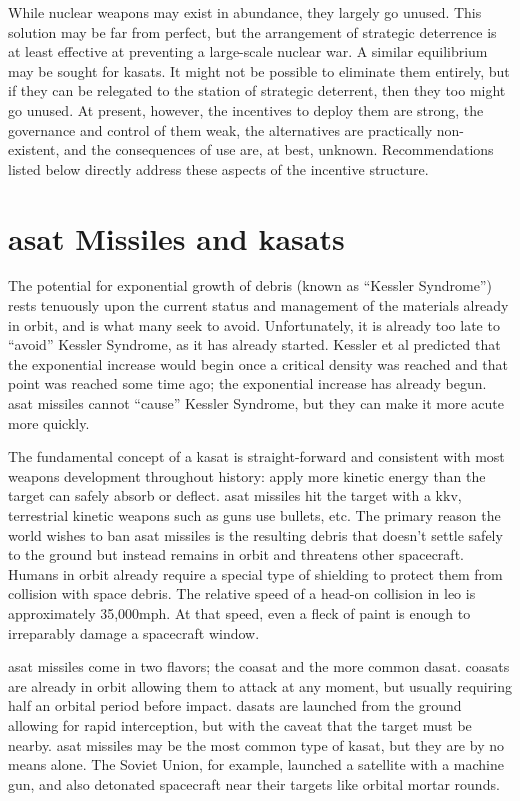 While nuclear weapons may exist in abundance, they largely go unused.
This solution may be far from perfect, but the arrangement of
strategic deterrence is at least effective at preventing a large-scale
nuclear war.  A similar equilibrium may be sought for \acp{kasat}.  It
might not be possible to eliminate them entirely, but if they can be
relegated to the station of strategic deterrent, then they too might
go unused.  At present, however, the incentives to deploy them are
strong, the governance and control of them weak, the alternatives are
practically non-existent, and the consequences of use are, at best,
unknown.  Recommendations listed below directly address these aspects
of the incentive structure.

\section*{\ac{asat} Missiles and \acfp{kasat}}

The potential for exponential growth of debris (known as ``Kessler
Syndrome'') rests tenuously upon the current status and management of
the materials already in orbit, and is what many seek to avoid.
Unfortunately, it is already too late to ``avoid'' Kessler Syndrome,
as it has already started.  Kessler et al predicted that the
exponential increase would begin once a critical density was reached
and that point was reached some time ago; the exponential increase has
already begun.\cite[p14]{kessler-reunion} \ac{asat} missiles cannot
``cause'' Kessler Syndrome, but they can make it more acute more
quickly.\cite[p10]{kessler-reunion}

The fundamental concept of a \ac{kasat} is straight-forward and
consistent with most weapons development throughout history: apply
more kinetic energy than the target can safely absorb or deflect.
\ac{asat} missiles hit the target with a \ac{kkv}, terrestrial kinetic
weapons such as guns use bullets, etc.  The primary reason the world
wishes to ban \ac{asat} missiles is the resulting debris that doesn't
settle safely to the ground but instead remains in orbit and threatens
other spacecraft.  Humans in orbit already require a special type of
shielding to protect them from collision with space
debris.\cite{whipple-me-spacecraft} The relative speed of a head-on
collision in \ac{leo} is approximately 35,000mph.  At that speed, even
a fleck of paint is enough to irreparably damage a spacecraft
window.\cite{paint-is-power}

\ac{asat} missiles come in two flavors; the \acf{coasat} and the more
common \acf{dasat}.\cite{brian} \acp{coasat} are already in orbit
allowing them to attack at any moment, but usually requiring half an
orbital period before impact.\cite{brian} \acp{dasat} are launched
from the ground allowing for rapid interception, but with the caveat
that the target must be nearby.\cite{grego} \ac{asat} missiles may be
the most common type of \ac{kasat}, but they are by no means alone.
The Soviet Union, for example, launched a satellite with a machine
gun, and also detonated spacecraft near their targets like orbital
mortar rounds.\cite{brian}

